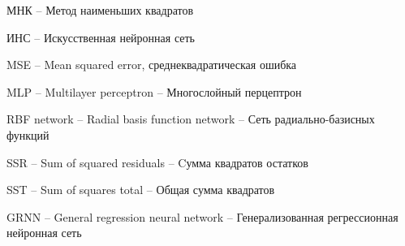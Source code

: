 \label{sec:definitions}

МНК -- Метод наименьших квадратов

ИНС -- Искусственная нейронная сеть

MSE -- Mean squared error, среднеквадратическая ошибка

MLP -- Multilayer perceptron -- Многослойный перцептрон

RBF network -- Radial basis function network -- Сеть радиально-базисных функций

SSR -- Sum of squared residuals -- Cумма квадратов остатков

SST -- Sum of squares total -- Общая сумма квадратов 

GRNN -- General regression neural network -- Генерализованная регрессионная нейронная сеть\\
